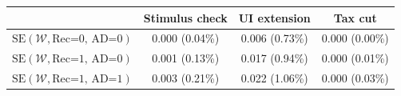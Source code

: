 \begin{tabular}{@{}lccc@{}}
\toprule
                          & Stimulus check      & UI extension    & Tax cut    \\  \midrule
$\mathrm{SE}(\mathcal{W}, \text{Rec=0, AD=0})$ & 0.000 (0.04\%)  & 0.006 (0.73\%)  & 0.000 (0.00\%)     \\
$\mathrm{SE}(\mathcal{W}, \text{Rec=1, AD=0})$ & 0.001 (0.13\%)  & 0.017 (0.94\%)  & 0.000 (0.01\%)     \\
$\mathrm{SE}(\mathcal{W}, \text{Rec=1, AD=1})$ & 0.003 (0.21\%)  & 0.022 (1.06\%)  & 0.000 (0.03\%)     \\ \bottomrule
\end{tabular}
